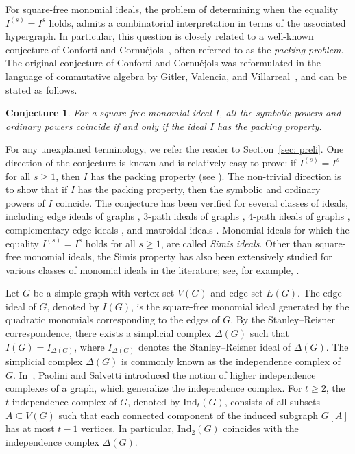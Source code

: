 \documentclass[12pt]{amsart}
\newtheorem{conjecture}[proposition]{Conjecture}
\begin{document}
For square-free monomial ideals, the problem of determining when the equality $I^{(s)} = I^s$ holds, admits a combinatorial interpretation in terms of the associated hypergraph. In particular, this question is closely related to a well-known conjecture of Conforti and Cornu\'{e}jols~\cite{1990Cornejols-et.al}, often referred to as the \emph{packing problem}. The original conjecture of Conforti and Cornu\'{e}jols was reformulated in the language of commutative algebra by Gitler, Valencia, and Villarreal~\cite{2005Gitler-et.al}, and can be stated as follows.

\begin{conjecture}
	For a square-free monomial ideal $I$, all the symbolic powers and ordinary powers coincide if and only if the ideal $I$ has the packing property.
\end{conjecture}

For any unexplained terminology, we refer the reader to Section~\ref{sec: preli}. One direction of the conjecture is known and is relatively easy to prove: if $I^{(s)} = I^s$ for all $s \ge 1$, then $I$ has the packing property (see \cite[Section 4]{2015Dao-et.el}). The non-trivial direction is to show that if $I$ has the packing property, then the symbolic and ordinary powers of $I$ coincide. The conjecture has been verified for several classes of ideals, including edge ideals of graphs \cite{1994Simis-et.al}, $3$-path ideals of graphs \cite{Alilooee-Banerjee}, $4$-path ideals of graphs \cite{2024Nasernejad}, complementary edge ideals \cite{2025Roy-Saha}, and matroidal ideals \cite{2025Ficarra-Moradi}. Monomial ideals for which the equality $I^{(s)} = I^s$ holds for all $s \geq 1$, are called \emph{Simis ideals}. Other than square-free monomial ideals, the Simis property has also been extensively studied for various classes of monomial ideals in the literature; see, for example, \cite{2023Banerjee-et.al, 2025Banerjee-et.al, 2024Kannoy, Gimnez-et.al2018, Grisalde.et.al2024, MandalPradhan2021, MandalPradhan2022, 2025Pinto-et.al}.

Let $G$ be a simple graph with vertex set $V(G)$ and edge set $E(G)$. The edge ideal of $G$, denoted by $I(G)$, is the square-free monomial ideal generated by the quadratic monomials corresponding to the edges of $G$. By the Stanley--Reisner correspondence, there exists a simplicial complex $\Delta(G)$ such that $I(G)=I_{\Delta(G)}$, where $I_{\Delta(G)}$ denotes the Stanley--Reisner ideal of $\Delta(G)$. The simplicial complex $\Delta(G)$ is commonly known as the independence complex of $G$. In~\cite{Paolini-Salvetti}, Paolini and Salvetti introduced the notion of higher independence complexes of a graph, which generalize the independence complex. For $t\ge 2$, the $t$-independence complex of $G$, denoted by $\mathrm{Ind}_t(G)$, consists of all subsets $A\subseteq V(G)$ such that each connected component of the induced subgraph $G[A]$ has at most $t-1$ vertices. In particular, $\mathrm{Ind}_2(G)$ coincides with the independence complex $\Delta(G)$.
\end{document}

